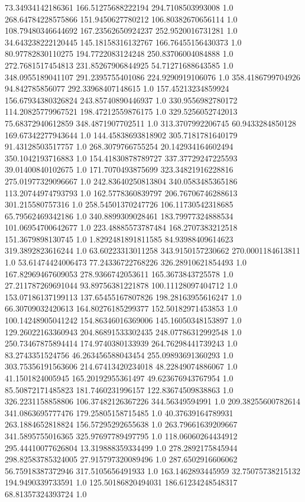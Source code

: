 73.34934142186361	166.51275688222194	294.7108503993008	1.0
268.64784228575866	151.9450627780212	106.80382670656114	1.0
108.79480346644692	167.23562650924237	252.9520016731281	1.0
34.643238222120445	145.18158316132767	166.76455156430373	1.0
80.97782830110275	194.7722083124248	250.83706004084888	1.0
272.7681517454813	231.85267906844925	54.71271688643585	1.0
348.0955189041107	291.2395755401086	224.9290919106076	1.0
358.4186799704926	94.842785856077	292.33968407148615	1.0
157.45213234859924	156.67934380326824	243.85740890446937	1.0
330.9556982780172	114.20825779967521	198.47212559876175	1.0
329.5256052742013	75.68372940612859	348.4871907702511	1.0
313.3707992206745	60.9433284850128	169.67342277943644	1.0
144.45838693818902	305.7181781640179	91.43128503517757	1.0
268.3079766755254	20.142934164602494	350.1042193716883	1.0
154.41830878789727	337.37729247225593	39.01400840102675	1.0
171.7070493875699	323.34821916228816	275.01977329096667	1.0
242.83640250813804	340.0583485365186	113.20744974793793	1.0
162.5778360839797	206.76706746288613	301.215580757316	1.0
258.54501370247726	106.11730542318685	65.79562469342186	1.0
340.8899309028461	183.79977324888534	101.06954700642677	1.0
223.48885573787484	168.2707383212518	151.3679898130745	1.0
1.8292481891811585	84.93988409614623	319.3892823616244	1.0
63.60223313011258	343.9150157230662	270.0001184613811	1.0
53.61474424006473	77.24336722768226	326.28910621854493	1.0
167.82969467609053	278.9366742053611	165.3673843725578	1.0
27.211787269691044	93.89756381221878	100.11128097404712	1.0
153.07186137199113	137.65455167807826	198.28163955616247	1.0
66.30709032420613	164.80276185299377	152.50182971453853	1.0
100.14248905041242	154.86346016369006	145.16050348153897	1.0
129.26022163360943	204.86891533302435	248.07786312992548	1.0
250.73467875894414	174.9740380133939	264.76298441739243	1.0
83.2743351524756	46.263456588043454	255.09893691360293	1.0
303.75356191563606	214.67413420234018	48.22849074886067	1.0
41.1501824005945	165.20192955361497	49.623676943767954	1.0
85.50872171485823	181.7460231996157	122.83674509838863	1.0
326.2231158858806	106.37482126367226	344.56349594991	1.0
209.38255600782614	341.0863695777476	179.25805158715485	1.0
40.37639164789931	263.1884652818824	156.57295292655638	1.0
263.79661639209667	341.5895755016365	325.97697789497795	1.0
118.06060264434912	295.44410077626804	13.319888359334499	1.0
278.2892175845944	298.82583785324005	27.915797320089496	1.0
287.6502916606062	56.75918387372946	317.5105656491933	1.0
163.1462893445959	32.75075738215132	194.9490339733591	1.0
125.50186820494031	186.61234248548317	68.81357324393724	1.0
